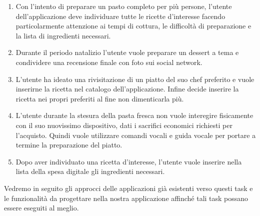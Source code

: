 \begin{enumerate}
\label{tasks}
\item Con l'intento di preparare un pasto completo per più persone,
l'utente dell'applicazione deve individuare tutte le ricette d'interesse
facendo particolarmente attenzione ai tempi di cottura, le difficoltà di
preparazione e la lista di ingredienti necessari.

\item Durante il periodo natalizio l'utente vuole preparare un dessert a tema
e condividere una recensione finale con foto sui social network.


\item L'utente ha ideato una rivisitazione di un piatto del suo chef
preferito e vuole inserirne la ricetta nel catalogo dell'applicazione.
Infine decide inserire la ricetta nei propri preferiti al fine non
dimenticarla più.

\item L'utente durante la stesura della pasta fresca non vuole
interegire fisicamente con il suo nuovissimo dispositivo, dati i
sacrifici economici richiesti per l'acquisto. Quindi vuole utilizzare
comandi vocali e guida vocale  per portare a termine la preparazione del
piatto.

\item Dopo aver individuato una ricetta d'interesse, l'utente vuole
inserire nella lista della spesa digitale gli ingredienti necessari.
\end{enumerate}

Vedremo in seguito gli approcci delle applicazioni già esistenti verso
questi task e le funzionalità da progettare nella nostra applicazione
affinché tali task possano essere eseguiti al meglio.
